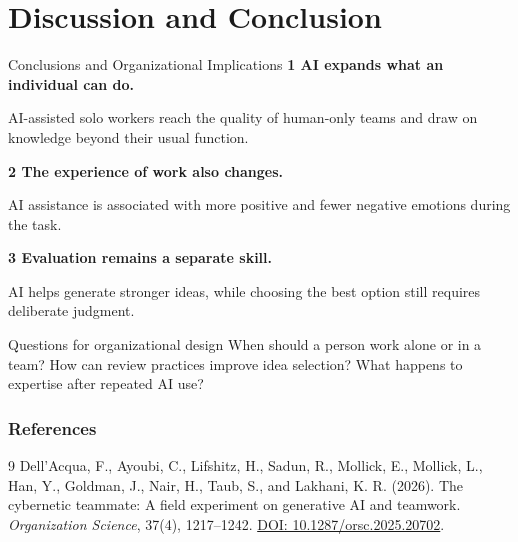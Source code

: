 \section{Discussion and Conclusion}
\begin{frame}[t]{Conclusions and Organizational Implications}
\small
\textcolor{paperred}{\bfseries 1 \quad AI expands what an individual can do.}\par\smallskip
AI-assisted solo workers reach the quality of human-only teams and draw on knowledge beyond their usual function.

\vspace{0.38cm}
\textcolor{paperred}{\bfseries 2 \quad The experience of work also changes.}\par\smallskip
AI assistance is associated with more positive and fewer negative emotions during the task.

\vspace{0.38cm}
\textcolor{paperred}{\bfseries 3 \quad Evaluation remains a separate skill.}\par\smallskip
AI helps generate stronger ideas, while choosing the best option still requires deliberate judgment.

\vspace{0.40cm}
\begin{alertblock}{Questions for organizational design}
When should a person work alone or in a team? How can review practices improve idea selection? What happens to expertise after repeated AI use?
\end{alertblock}

\end{frame}


\begin{frame}
  \frametitle{References}
  \small
  \begin{thebibliography}{9}
  Dell'Acqua, F., Ayoubi, C., Lifshitz, H., Sadun, R., Mollick, E., Mollick, L.,
  Han, Y., Goldman, J., Nair, H., Taub, S., and Lakhani, K. R. (2026).
  \newblock The cybernetic teammate: A field experiment on generative AI and teamwork.
  \newblock \emph{Organization Science}, 37(4), 1217--1242.
  \newblock \href{https://doi.org/10.1287/orsc.2025.20702}{DOI: 10.1287/orsc.2025.20702}.
  \end{thebibliography}
\end{frame}


